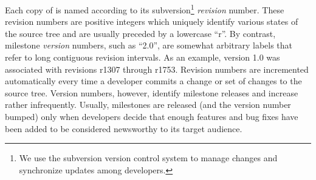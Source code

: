 

Each copy of \libflame is named according to its subversion\footnote{We use
the subversion version control system to manage changes and synchronize
updates among developers.
}
{\em revision} number.
These revision numbers are positive integers which uniquely identify various
states of the \libflame source tree and are usually preceded by a lowercase
``r''.
By contrast, milestone {\em version} numbers, such as ``2.0'', are somewhat
arbitrary labels that refer to long contiguous revision intervals.
As an example, version 1.0 was associated with revisions r1307 through r1753.
Revision numbers are incremented automatically every time a developer commits
a change or set of changes to the \libflame source tree.
Version numbers, however, identify milestone releases and increase rather
infrequently.
Usually, milestones are released (and the version number bumped) only
when \libflame developers decide that enough features and bug fixes have been
added to be considered newsworthy to its target audience.

